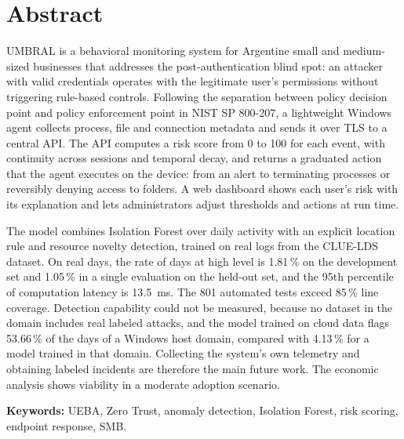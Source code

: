 \chapter*{Abstract}

UMBRAL is a behavioral monitoring system for Argentine small and medium-sized businesses that addresses the post-authentication blind spot: an attacker with valid credentials operates with the legitimate user's permissions without triggering rule-based controls. Following the separation between policy decision point and policy enforcement point in NIST SP 800-207, a lightweight Windows agent collects process, file and connection metadata and sends it over TLS to a central API. The API computes a risk score from 0 to 100 for each event, with continuity across sessions and temporal decay, and returns a graduated action that the agent executes on the device: from an alert to terminating processes or reversibly denying access to folders. A web dashboard shows each user's risk with its explanation and lets administrators adjust thresholds and actions at run time.

The model combines Isolation Forest over daily activity with an explicit location rule and resource novelty detection, trained on real logs from the CLUE-LDS dataset. On real days, the rate of days at high level is 1.81\,\% on the development set and 1.05\,\% in a single evaluation on the held-out set, and the 95th percentile of computation latency is 13.5~ms. The 801 automated tests exceed 85\,\% line coverage. Detection capability could not be measured, because no dataset in the domain includes real labeled attacks, and the model trained on cloud data flags 53.66\,\% of the days of a Windows host domain, compared with 4.13\,\% for a model trained in that domain. Collecting the system's own telemetry and obtaining labeled incidents are therefore the main future work. The economic analysis shows viability in a moderate adoption scenario.

\vspace{1em}
\noindent\textbf{Keywords:} UEBA, Zero Trust, anomaly detection, Isolation Forest, risk scoring, endpoint response, SMB.
